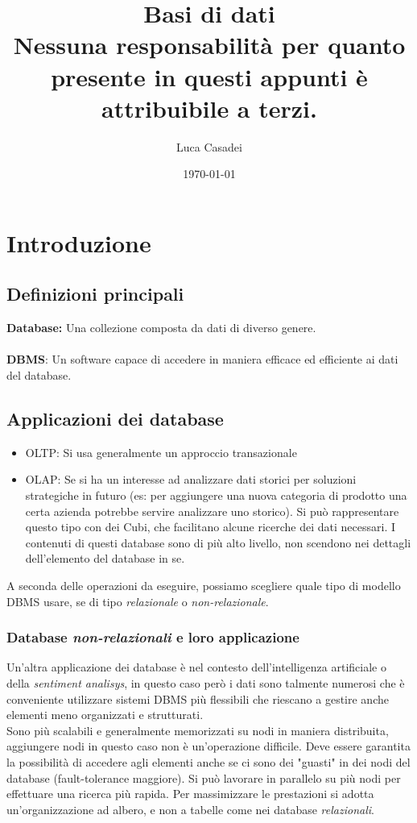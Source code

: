 \documentclass[a4paper,12pt]{report}
\title{\textbf{Basi di dati}\\Nessuna responsabilità per quanto presente in questi appunti è attribuibile a terzi.}
\author{Luca Casadei}
\date{\today}
\begin{document}
	\maketitle
	\tableofcontents

	\chapter{Introduzione}
	\section{Definizioni principali}
	\textbf{Database:} Una collezione composta da dati di diverso genere.\\\\
	\textbf{DBMS}: Un software capace di accedere in maniera efficace ed efficiente ai dati del database.\\
	\section{Applicazioni dei database}
	\begin{itemize}
		\item OLTP: Si usa generalmente un approccio transazionale
		\item OLAP: Se si ha un interesse ad analizzare dati storici per soluzioni strategiche in futuro (es: per aggiungere una nuova categoria di prodotto una certa azienda potrebbe servire analizzare uno storico). Si può rappresentare questo tipo con dei Cubi, che facilitano alcune ricerche dei dati necessari. I contenuti di questi database sono di più alto livello, non scendono nei dettagli dell'elemento del database in se.
	\end{itemize}
A seconda delle operazioni da eseguire, possiamo scegliere quale tipo di modello DBMS usare, se di tipo \textit{relazionale} o \textit{non-relazionale}.
\subsection*{Database \textit{non-relazionali} e loro applicazione}
Un'altra applicazione dei database è nel contesto dell'intelligenza artificiale o della \textit{sentiment analisys}, in questo caso però i dati sono talmente numerosi che è conveniente utilizzare sistemi DBMS più flessibili che riescano a gestire anche elementi meno organizzati e strutturati.\\
Sono più scalabili e generalmente memorizzati su nodi in maniera distribuita, aggiungere nodi in questo caso non è un'operazione difficile.
Deve essere garantita la possibilità di accedere agli elementi anche se ci sono dei "guasti" in dei nodi del database (fault-tolerance maggiore). Si può lavorare in parallelo su più nodi per effettuare una ricerca più rapida. Per massimizzare le prestazioni si adotta un'organizzazione ad albero, e non a tabelle come nei database \textit{relazionali}.
\end{document}
